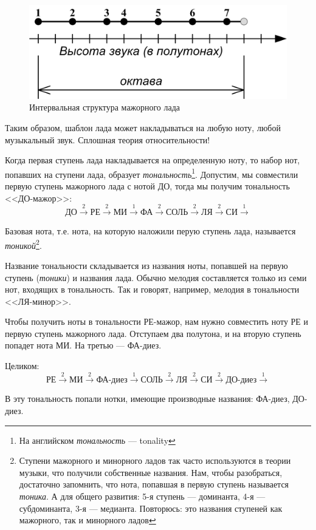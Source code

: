 \begin{figure}[!ht]
    \centering
    \includegraphics{fig/intervals/mode-maj} 
    \caption{Интервальная структура мажорного лада}\label{fig:harmony:lad:mode:maj}
\end{figure} 

Таким образом, шаблон лада может накладываться на любую ноту, любой музыкальный звук. Сплошная теория относительности!

Когда первая ступень лада накладывается на определенную ноту, то набор нот, попавших на ступени лада, образует \emph{тональность}\footnote{На английском \emph{тональность} --- tonality}. Допустим, мы совместили первую ступень мажорного лада с нотой ДО, тогда мы получим тональность <<ДО-мажор>>: 
\[
    \text{ДО}\xrightarrow{2}
    \text{РЕ}\xrightarrow{2}
    \text{МИ}\xrightarrow{1}
    \text{ФА}\xrightarrow{2}
    \text{СОЛЬ}\xrightarrow{2}
    \text{ЛЯ}\xrightarrow{2}
    \text{СИ}\xrightarrow{1}
\]

Базовая нота, т.е. нота, на которую наложили перую ступень лада, называется \emph{тоникой}\footnote{Ступени мажорного и минорного ладов так часто используются в теории музыки, что получили собственные названия. Нам, чтобы разобраться, достаточно запомнить, что нота, попавшая в первую ступень называется \emph{тоника}. А для общего развития: 5-я ступень --- доминанта, 4-я --- субдоминанта, 3-я --- медианта. Повторюсь: это названия ступеней как мажорного, так и минорного ладов}.

Название тональности складывается из названия ноты, попавшей на первую ступень (\emph{тоники}) и названия лада. Обычно мелодия составляется только из семи нот, входящих в тональность. Так и говорят, например, мелодия в тональности <<ЛЯ-минор>>.

\begin{Example}
    \label{ex:harmony:lad:d:maj}
    
    Чтобы получить ноты в тональности РЕ-мажор, нам нужно совместить ноту РЕ и первую ступень мажорного лада. Отступаем два полутона, и на вторую ступень попадет нота МИ. На третью --- ФА-диез.
    
    Целиком:
    \[
        \text{РЕ}\xrightarrow{2} 
        \text{МИ}\xrightarrow{2} 
        \text{ФА-диез}\xrightarrow{1} 
        \text{СОЛЬ}\xrightarrow{2} 
        \text{ЛЯ}\xrightarrow{2} 
        \text{СИ}\xrightarrow{2} 
        \text{ДО-диез}\xrightarrow{1}
    \]
    
    В эту тональность попали нотки, имеющие производные названия: ФА-диез, ДО-диез.
\end{Example}

